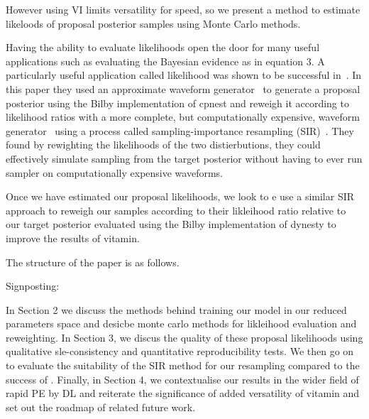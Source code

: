 \documentclass[aps,superscriptaddress,twocolumn,nopreprintnumbers,floatfix,groupedaddress]{revtex4-1}
\begin{document}
However using VI limits versatility for speed, so we present a method to estimate likeloods of proposal posterior samples using Monte Carlo methods.

Having the ability to evaluate likelihoods open the door for many useful applications such as evaluating the Bayesian evidence as in equation 3. A particularly useful application called likelihood was shown to be successful in~\cite{OzGrav}. In this paper they used an approximate waveform generator~\cite{IMRPhenomD} to generate a proposal posterior using the Bilby implementation of cpnest and reweigh it according to likelihood ratios with a more complete, but computationally expensive, waveform generator~\cite{NRHybSur3dq8} using a process called sampling-importance resampling (SIR)~\cite{brian2006resampling}. They found by rewighting the likelihoods of the two distierbutions, they could effectively simulate sampling from the target posterior without having to ever run sampler on computationally expensive waveforms.

Once we have estimated our proposal likelihoods, we look to e use a similar SIR approach to reweigh our samples according to their likleihood ratio relative to our target posterior evaluated using the Bilby implementation of dynesty to improve the results of vitamin.

The structure of the paper is as follows. 


Signposting:

In Section 2 we discuss the methods behind training our model in our reduced parameters space and desicbe monte carlo methods for likleihood evaluation and reweighting. In Section 3, we discus the quality of these proposal likelihoods using qualitative sle-consistency and quantitative reproducibility tests. We then go on to evaluate the suitability of the SIR method for our resampling compared to the success of \cite{OzGrav}. Finally, in Section 4, we contextualise our results in the wider field of rapid PE by DL and reiterate the significance of added versatility of vitamin and set out the roadmap of related future work.
\end{document}
